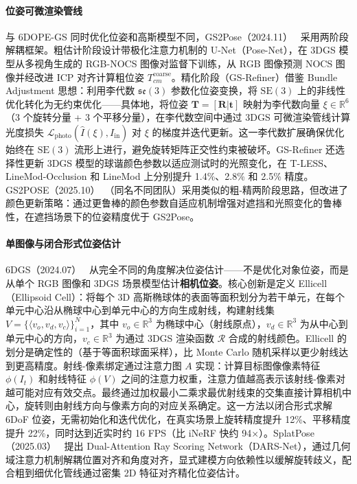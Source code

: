 \paragraph{位姿可微渲染管线} 与 6DOPE-GS 同时优化位姿和高斯模型不同，GS2Pose（2024.11）~\cite{2411_03807} 采用两阶段解耦框架。粗估计阶段设计带极化注意力机制的 U-Net（Pose-Net），在 3DGS 模型从多视角生成的 RGB-NOCS 图像对监督下训练，从 RGB 图像预测 NOCS 图像并经改进 ICP 对齐计算粗位姿 $T_{cm}^{\text{coarse}}$。精化阶段（GS-Refiner）借鉴 Bundle Adjustment 思想：利用李代数 $\mathfrak{se}(3)$ 参数化位姿变换，将 $\mathrm{SE}(3)$ 上的非线性优化转化为无约束优化——具体地，将位姿 $\mathbf{T} = [\mathbf{R} | \mathbf{t}]$ 映射为李代数向量 $\xi \in \mathbb{R}^6$（3 个旋转分量 + 3 个平移分量），在李代数空间中通过 3DGS 可微渲染管线计算光度损失 $\mathcal{L}_{\text{photo}}(\hat{I}(\xi), I_{\text{in}})$ 对 $\xi$ 的梯度并迭代更新。这一李代数扩展确保优化始终在 $\mathrm{SE}(3)$ 流形上进行，避免旋转矩阵正交性约束被破坏。GS-Refiner 还选择性更新 3DGS 模型的球谐颜色参数以适应测试时的光照变化，在 T-LESS、LineMod-Occlusion 和 LineMod 上分别提升 1.4\%、2.8\% 和 2.5\% 精度。GS2POSE（2025.10）~\cite{2510_16777}（同名不同团队）采用类似的粗-精两阶段思路，但改进了颜色更新策略：通过更鲁棒的颜色参数自适应机制增强对遮挡和光照变化的鲁棒性，在遮挡场景下的位姿精度优于 GS2Pose。

\paragraph{单图像与闭合形式位姿估计} 6DGS（2024.07）~\cite{2407_15484} 从完全不同的角度解决位姿估计——不是优化对象位姿，而是从单个 RGB 图像和 3DGS 场景模型估计\textbf{相机位姿}。核心创新是定义 Ellicell（Ellipsoid Cell）：将每个 3D 高斯椭球体的表面等面积划分为若干单元，在每个单元中心沿从椭球中心到单元中心的方向生成射线，构建射线集 $V = \{\langle v_o, v_d, v_c \rangle\}_{i=1}^N$，其中 $v_o \in \mathbb{R}^3$ 为椭球中心（射线原点），$v_d \in \mathbb{R}^3$ 为从中心到单元中心的方向，$v_c \in \mathbb{R}^3$ 为通过 3DGS 渲染函数 $\mathcal{R}$ 合成的射线颜色。Ellicell 的划分是确定性的（基于等面积球面采样），比 Monte Carlo 随机采样以更少射线达到更高精度。射线-像素绑定通过注意力图 $A$ 实现：计算目标图像像素特征 $\phi(I_t)$ 和射线特征 $\phi(V)$ 之间的注意力权重，注意力值越高表示该射线-像素对越可能对应有效交点。最终通过加权最小二乘求最优射线束的交集直接计算相机中心，旋转则由射线方向与像素方向的对应关系确定。这一方法以闭合形式求解 6DoF 位姿，无需初始化和迭代优化，在真实场景上旋转精度提升 12\%、平移精度提升 22\%，同时达到近实时约 16 FPS（比 iNeRF 快约 94$\times$）。SplatPose（2025.03）~\cite{2503_05174} 提出 Dual-Attention Ray Scoring Network（DARS-Net），通过几何域注意力机制解耦位置对齐和角度对齐，显式建模方向依赖性以缓解旋转歧义，配合粗到细优化管线通过密集 2D 特征对齐精化位姿估计。

